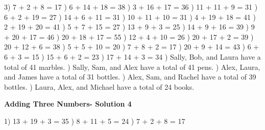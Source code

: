 \documentclass{article}%
\begin{document}
3) 7 + 2 + 8 = 17%
) 6 + 14 + 18 = 38%
) 3 + 16 + 17 = 36%
) 11 + 11 + 9 = 31%
) 6 + 2 + 19 = 27%
) 14 + 6 + 11 = 31%
) 10 + 11 + 10 = 31%
) 4 + 19 + 18 = 41%
) 2 + 19 + 20 = 41%
) 5 + 7 + 15 = 27%
) 13 + 9 + 3 = 25%
) 14 + 9 + 16 = 39%
) 9 + 20 + 17 = 46%
) 20 + 18 + 17 = 55%
) 12 + 4 + 10 = 26%
) 20 + 17 + 2 = 39%
) 20 + 12 + 6 = 38%
) 5 + 5 + 10 = 20%
) 7 + 8 + 2 = 17%
) 20 + 9 + 14 = 43%
) 6 + 6 + 3 = 15%
) 15 + 6 + 2 = 23%
) 17 + 14 + 3 = 34%
) Sally, Bob, and Laura have a total of 41 marbles.%
) Sally, Sam, and Alex have a total of 41 pens.%
) Alex, Laura, and James have a total of 31 bottles.%
) Alex, Sam, and Rachel have a total of 39 bottles.%
) Laura, Alex, and Michael have a total of 24 books.%
\newline%
\newpage%
\large%
\begin{center}%
\textbf{Adding Three Numbers- Solution 4}%
\newline%
\end{center} \normalsize%
1) 13 + 19 + 3 = 35%
) 8 + 11 + 5 = 24%
) 7 + 2 + 8 = 17%
\newline%
\end{document}
